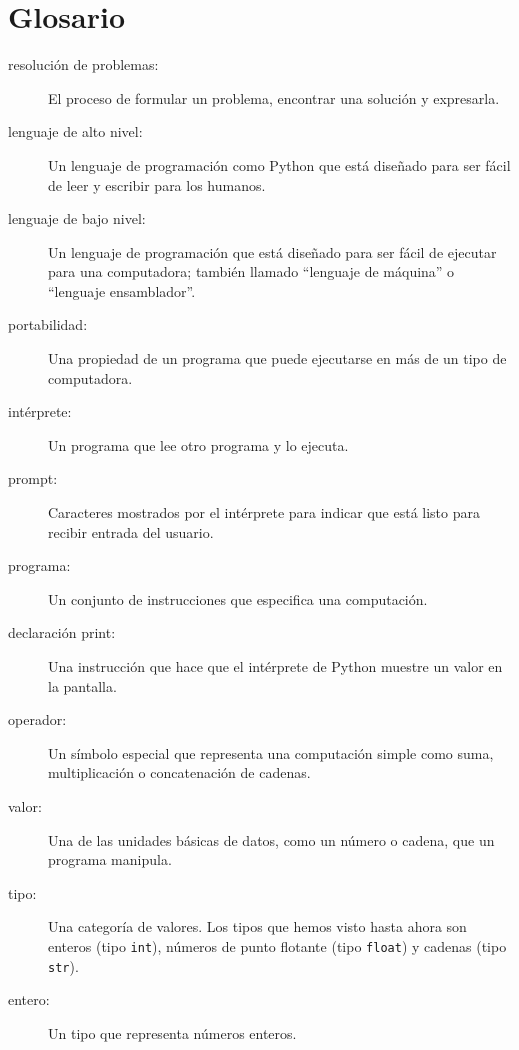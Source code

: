 \documentclass[12pt,letterpaper]{book}
\begin{document}
\section{Glosario}

\begin{description}
\item[resolución de problemas:] El proceso de formular un problema, encontrar una solución y expresarla.

\item[lenguaje de alto nivel:] Un lenguaje de programación como Python que está diseñado para ser fácil de leer y escribir para los humanos.

\item[lenguaje de bajo nivel:] Un lenguaje de programación que está diseñado para ser fácil de ejecutar para una computadora; también llamado ``lenguaje de máquina'' o ``lenguaje ensamblador''.

\item[portabilidad:] Una propiedad de un programa que puede ejecutarse en más de un tipo de computadora.

\item[intérprete:] Un programa que lee otro programa y lo ejecuta.

\item[prompt:] Caracteres mostrados por el intérprete para indicar que está listo para recibir entrada del usuario.

\item[programa:] Un conjunto de instrucciones que especifica una computación.

\item[declaración print:] Una instrucción que hace que el intérprete de Python muestre un valor en la pantalla.

\item[operador:] Un símbolo especial que representa una computación simple como suma, multiplicación o concatenación de cadenas.

\item[valor:] Una de las unidades básicas de datos, como un número o cadena, que un programa manipula.

\item[tipo:] Una categoría de valores. Los tipos que hemos visto hasta ahora son enteros (tipo \texttt{int}), números de punto flotante (tipo \texttt{float}) y cadenas (tipo \texttt{str}).

\item[entero:] Un tipo que representa números enteros.


\end{description}
\end{document}
